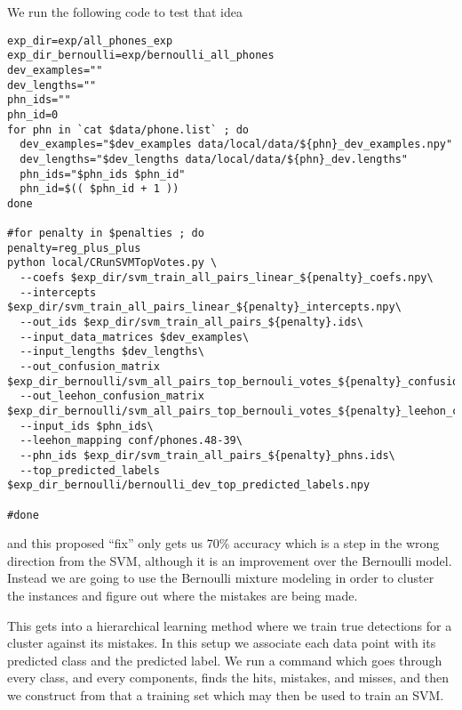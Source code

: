 \documentclass{article}
\begin{document}
We run the following code to test that idea
\begin{verbatim}
exp_dir=exp/all_phones_exp
exp_dir_bernoulli=exp/bernoulli_all_phones
dev_examples=""
dev_lengths=""
phn_ids=""
phn_id=0
for phn in `cat $data/phone.list` ; do
  dev_examples="$dev_examples data/local/data/${phn}_dev_examples.npy"
  dev_lengths="$dev_lengths data/local/data/${phn}_dev.lengths"
  phn_ids="$phn_ids $phn_id"
  phn_id=$(( $phn_id + 1 ))
done

#for penalty in $penalties ; do
penalty=reg_plus_plus
python local/CRunSVMTopVotes.py \
  --coefs $exp_dir/svm_train_all_pairs_linear_${penalty}_coefs.npy\
  --intercepts $exp_dir/svm_train_all_pairs_linear_${penalty}_intercepts.npy\
  --out_ids $exp_dir/svm_train_all_pairs_${penalty}.ids\
  --input_data_matrices $dev_examples\
  --input_lengths $dev_lengths\
  --out_confusion_matrix $exp_dir_bernoulli/svm_all_pairs_top_bernouli_votes_${penalty}_confusion.npy\
  --out_leehon_confusion_matrix $exp_dir_bernoulli/svm_all_pairs_top_bernouli_votes_${penalty}_leehon_confusion.npy\
  --input_ids $phn_ids\
  --leehon_mapping conf/phones.48-39\
  --phn_ids $exp_dir/svm_train_all_pairs_${penalty}_phns.ids\
  --top_predicted_labels $exp_dir_bernoulli/bernoulli_dev_top_predicted_labels.npy

#done

\end{verbatim}
and this proposed ``fix'' only gets us 70\%
accuracy which is a step in the wrong direction from the SVM, although it is an improvement over the Bernoulli model.
Instead we are going to use the Bernoulli mixture modeling in order
to cluster the instances and figure out where the mistakes are being
made.

This gets into a hierarchical learning method where we train
true detections for a cluster against its mistakes.  In this
setup we associate each data point with its predicted class
and the predicted label.  We run a command which goes through
every class, and every components, finds the hits, mistakes, and
misses, and then we construct from that a training set which
may then be used to train an SVM. 
\end{document}
